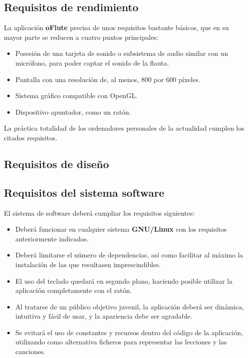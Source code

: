\subsection{Requisitos de rendimiento}

La aplicación \textbf{oFlute} precisa de unos requisitos bastante básicos,
que en su mayor parte se reducen a cuatro puntos principales:
\begin{itemize}
\item Posesión de una tarjeta de sonido o subsistema de audio similar con un
  micrófono, para poder captar el sonido de la flauta.
\item Pantalla con una resolución de, al menos, 800 por 600 píxeles.
\item Sistema gráfico compatible con OpenGL.
\item Dispositivo apuntador, como un ratón.
\end{itemize}

La práctica totalidad de los ordenadores personales de la actualidad cumplen los
citados requisitos.

\subsection{Requisitos de diseño}

\subsection{Requisitos del sistema software}
El sistema de software deberá cumpliar los requisitos siguientes:
\begin{itemize}
\item Deberá funcionar en cualquier sistema \textbf{GNU/Linux} con los
  requisitos anteriormente indicados.
\item Deberá limitarse el número de dependencias, así como facilitar al máximo
  la instalación de las que resultasen imprescindibles.
\item El uso del teclado quedará en segundo plano, haciendo posible utilizar la
  aplicación completamente con el ratón.
\item Al tratarse de un público objetivo juvenil, la aplicación deberá ser
  dinámica, intuitiva y fácil de usar, y la apariencia debe ser agradable.
\item Se evitará el uso de constantes y recursos dentro del código de la
  aplicación, utilizando como alternativa ficheros para representar las
  lecciones y las canciones.
\end{itemize}

